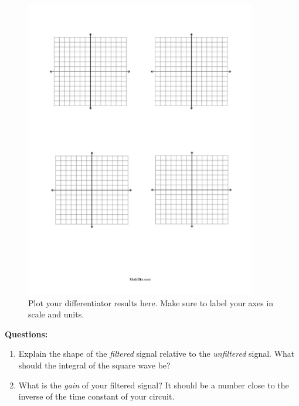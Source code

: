 \documentclass[12pt]{article}
\begin{document}
\begin{figure}[ht]
\centering
\includegraphics[width=0.9\textwidth,trim=0cm 18cm 0cm 2cm,clip=true]{axes.pdf}
\caption{\label{fig:axes} Plot your differentiator results here. Make sure to label your axes in scale and units.}
\end{figure}

\vspace{5cm}

\textbf{Questions:}
\begin{enumerate}
\item Explain the shape of the \textit{filtered} signal relative to the \textit{unfiltered} signal. What should the integral of the square wave be? \\ \vspace{1.5cm}
\item What is the \textit{gain} of your filtered signal?  It should be a number close to the inverse of the time constant of your circuit. \\ \vspace{1.5cm}
\end{enumerate}
\end{document}
